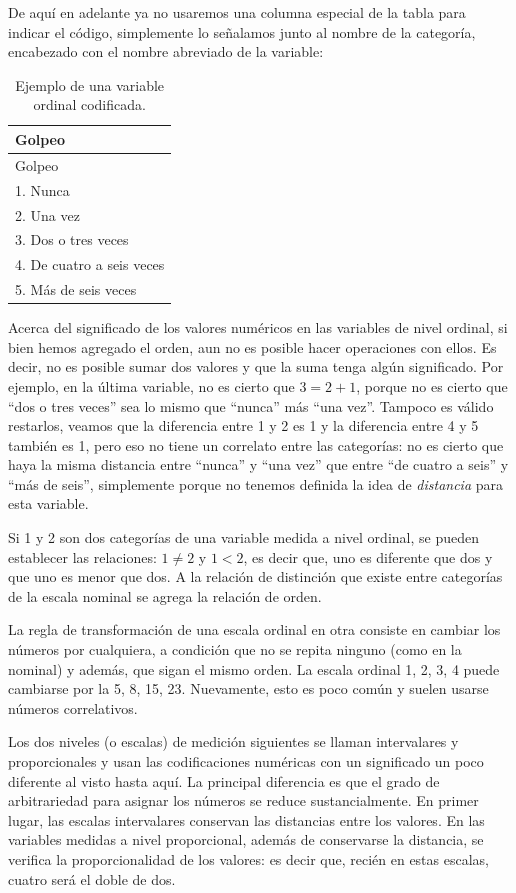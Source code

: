 \documentclass[]{book}
\begin{document}
De aquí en adelante ya no usaremos una columna especial de la tabla para indicar el código, simplemente lo señalamos junto al nombre de la categoría, encabezado con el nombre abreviado de la variable:

\begin{longtable}[]{@{}l@{}}
\caption{\label{tab:unnamed-chunk-10}Ejemplo de una variable ordinal codificada.}\tabularnewline
\toprule
Golpeo\tabularnewline
\midrule
\endfirsthead
\toprule
Golpeo\tabularnewline
\midrule
\endhead
1. Nunca\tabularnewline
2. Una vez\tabularnewline
3. Dos o tres veces\tabularnewline
4. De cuatro a seis veces\tabularnewline
5. Más de seis veces\tabularnewline
\bottomrule
\end{longtable}

Acerca del significado de los valores numéricos en las variables de nivel ordinal, si bien hemos agregado el orden, aun no es posible hacer operaciones con ellos. Es decir, no es posible sumar dos valores y que la suma tenga algún significado. Por ejemplo, en la última variable, no es cierto que \(3 = 2+1\), porque no es cierto que ``dos o tres veces'' sea lo mismo que ``nunca'' más ``una vez''. Tampoco es válido restarlos, veamos que la diferencia entre 1 y 2 es 1 y la diferencia entre 4 y 5 también es 1, pero eso no tiene un correlato entre las categorías: no es cierto que haya la misma distancia entre ``nunca'' y ``una vez'' que entre ``de cuatro a seis'' y ``más de seis'', simplemente porque no tenemos definida la idea de \emph{distancia} para esta variable.

Si 1 y 2 son dos categorías de una variable medida a nivel ordinal, se pueden establecer las relaciones: \(1 \neq 2\) y \(1<2\), es decir que, uno es diferente que dos y que uno es menor que dos. A la relación de distinción que existe entre categorías de la escala nominal se agrega la relación de orden.

La regla de transformación de una escala ordinal en otra consiste en cambiar los números por cualquiera, a condición que no se repita ninguno (como en la nominal) y además, que sigan el mismo orden. La escala ordinal 1, 2, 3, 4 puede cambiarse por la 5, 8, 15, 23. Nuevamente, esto es poco común y suelen usarse números correlativos.

Los dos niveles (o escalas) de medición siguientes se llaman intervalares y proporcionales y usan las codificaciones numéricas con un significado un poco diferente al visto hasta aquí. La principal diferencia es que el grado de arbitrariedad para asignar los números se reduce sustancialmente. En primer lugar, las escalas intervalares conservan las distancias entre los valores. En las variables medidas a nivel proporcional, además de conservarse la distancia, se verifica la proporcionalidad de los valores: es decir que, recién en estas escalas, cuatro será el doble de dos.
\end{document}

